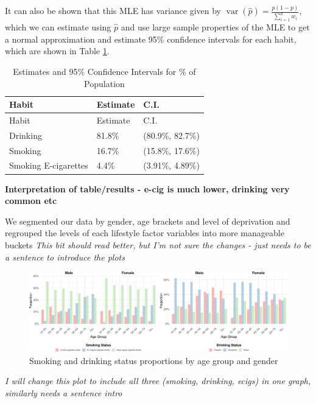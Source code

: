 \documentclass[
  11pt,
]{article}
\begin{document}
It can also be shown that this MLE has variance given by
\(\mathop{\mathrm{var}}(\widehat{p})=\frac{p(1-p)}{\sum_{i=1}^{n}w_i}\),
which we can estimate using \(\widehat{p}\) and use large sample
properties of the MLE to get a normal approximation and estimate 95\%
confidence intervals for each habit, which are shown in Table
\ref{tab:output-estimates-table}.

\begin{longtable}[]{@{}lll@{}}
\caption{Estimates and 95\% Confidence Intervals for \% of
Population\label{tab:output-estimates-table}}\tabularnewline
\toprule\noalign{}
Habit & Estimate & C.I. \\
\midrule\noalign{}
\endfirsthead
\toprule\noalign{}
Habit & Estimate & C.I. \\
\midrule\noalign{}
\endhead
\bottomrule\noalign{}
\endlastfoot
Drinking & 81.8\% & (80.9\%, 82.7\%) \\
Smoking & 16.7\% & (15.8\%, 17.6\%) \\
Smoking E-cigarettes & 4.4\% & (3.91\%, 4.89\%) \\
\end{longtable}

\textbf{Interpretation of table/results - e-cig is much lower, drinking
very common etc}

We segmented our data by gender, age brackets and level of deprivation
and regrouped the levels of each lifestyle factor variables into more
manageable buckets \emph{This bit should read better, but I'm not sure
the changes - just needs to be a sentence to introduce the plots}

\begin{figure}[H]
\includegraphics{Coursework_files/figure-latex/output smoking and drinking by age plot-1} \caption{Smoking and drinking status proportions by age group and gender}\label{fig:output smoking and drinking by age plot}
\end{figure}

\emph{I will change this plot to include all three (smoking, drinking,
ecigs) in one graph, similarly needs a sentence intro}
\end{document}
